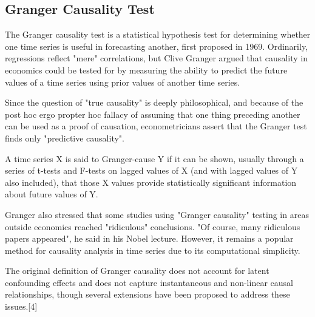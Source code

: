 
\subsection*{Granger Causality Test}
The Granger causality test is a statistical hypothesis test for determining whether one time series is useful in forecasting another, first proposed in 1969. Ordinarily, regressions reflect "mere" correlations, but Clive Granger argued that causality in economics could be tested for by measuring the ability to predict the future values of a time series using prior values of another time series. 

Since the question of "true causality" is deeply philosophical, and because of the post hoc ergo propter hoc fallacy of assuming that one thing preceding another can be used as a proof of causation, econometricians assert that the Granger test finds only "predictive causality".

A time series X is said to Granger-cause Y if it can be shown, usually through a series of t-tests and F-tests on lagged values of X (and with lagged values of Y also included), that those X values provide statistically significant information about future values of Y.

Granger also stressed that some studies using "Granger causality" testing in areas outside economics reached "ridiculous" conclusions. "Of course, many ridiculous papers appeared", he said in his Nobel lecture. However, it remains a popular method for causality analysis in time series due to its computational simplicity.

The original definition of Granger causality does not account for latent confounding effects and does not capture instantaneous and non-linear causal relationships, though several extensions have been proposed to address these issues.[4]
